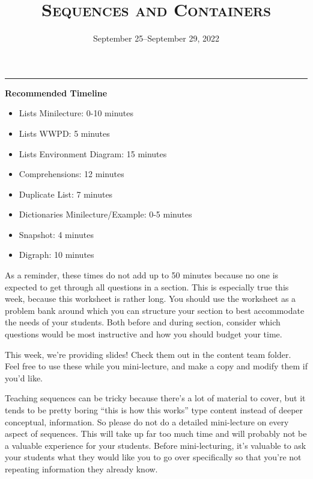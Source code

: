 \documentclass{exam}
\title{\textsc{Sequences and Containers}}
\date{September 25--September 29, 2022}
\begin{document}
\maketitle
\rule{\textwidth}{0.15em}
\fontsize{12}{15}\selectfont


\begin{meta}
    \textbf{Recommended Timeline}
    \begin{itemize}
        \item Lists Minilecture: 0-10 minutes
        \item Lists WWPD: 5 minutes
        \item Lists Environment Diagram: 15 minutes
        \item Comprehensions: 12 minutes
        \item Duplicate List: 7 minutes
        \item Dictionaries Minilecture/Example: 0-5 minutes
        \item Snapshot: 4 minutes
        \item Digraph: 10 minutes
    \end{itemize}

    As a reminder, these times do not add up to 50 minutes because no one is expected 
    to get through all questions in a section. This is especially true this week, 
    because this worksheet is rather long. You should use the worksheet as a problem bank
    around which you can structure your section to best accommodate the needs of your 
    students. Both before and during section, consider which questions would be most 
    instructive and how you should budget your time.

    This week, we're providing slides! Check them out in the content team folder. 
    Feel free to use these while you mini-lecture, and make a copy and modify them 
    if you'd like. 

    Teaching sequences can be tricky because there's a lot of material to cover, but 
    it tends to be pretty boring ``this is how this works'' type content instead of 
    deeper conceptual, information. So please do not do a detailed 
    mini-lecture on every aspect of sequences. This will take up far too much time and 
    will probably not be a valuable experience for your students. Before mini-lecturing, 
    it's valuable to ask your students what they would like you to go over specifically 
    so that you're not repeating information they already know. 
\end{meta}
\end{document}
